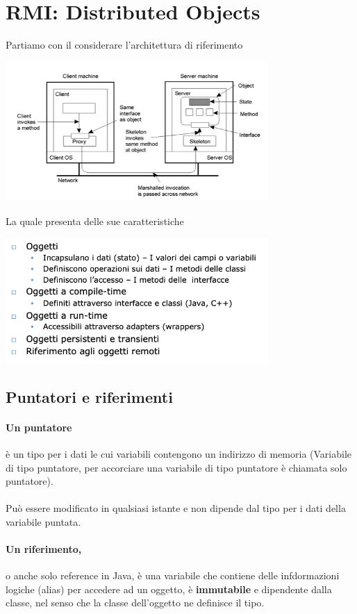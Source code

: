 \documentclass[12pt, a4paper, openany, twoside]{book}
\begin{document}
\section{RMI: Distributed Objects}
Partiamo con il considerare l'architettura di riferimento
\begin{center}
\includegraphics[width=0.75\textwidth]{19}
\end{center}
La quale presenta delle sue caratteristiche
\begin{center}
\includegraphics[width=0.75\textwidth]{20}
\end{center}
\subsection{Puntatori e riferimenti}
\paragraph{Un puntatore} è un tipo per i dati le cui variabili contengono un indirizzo
di memoria (Variabile di tipo puntatore, per accorciare una variabile di tipo
puntatore è chiamata solo puntatore). \\ \\
Può essere modificato in qualsiasi istante e non dipende dal tipo per i dati
della variabile puntata.
\paragraph{Un riferimento,} o anche solo reference in Java, è una variabile 
che contiene delle infdormazioni logiche (alias) per accedere ad un oggetto,
è \textbf{immutabile} e dipendente dalla classe, nel senso che la classe 
dell'oggetto ne definisce il tipo.
\end{document}

